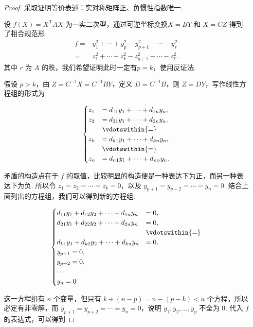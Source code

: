 \begin{proof}
    采取证明等价表述：实对称矩阵正、负惯性指数唯一.

    设 $f(X) = X^\mathrm{T}AX$ 为一实二次型，通过可逆坐标变换$X = BY$ 和 $X = CZ$ 得到了相合规范形
    \begin{align*}
        f ={} & y_1^2 + \cdots + y_p^2 - y_{p+1}^2 - \cdots - y_r^2 \\
          ={} & z_1^2 + \cdots + z_k^2 - z_{q+1}^2 - \cdots - z_r^2.
    \end{align*}
    其中 $r$ 为 $A$ 的秩，我们希望证明此时一定有$p = k$，使用反证法.

    假设 $p > k$，由 $Z = C^{-1}X = C^{-1}BY$，定义 $D = C^{-1}B$，则 $Z = DY$，写作线性方程组的形式为

    \[
        \begin{cases}
            z_1 & = d_{11}y_1 + \cdots + d_{1n}y_n, \\
            z_2 & = d_{21}y_1 + \cdots + d_{2n}y_n, \\
            & \vdotswithin{=} \\
            z_k & = d_{k1}y_1 + \cdots + d_{kn}y_n, \\
            & \vdotswithin{=} \\
            z_{n} & = d_{n1}y_1 + \cdots + d_{nn}y_n.
        \end{cases}
    \]

    矛盾的构造点在于 $f$ 的取值，比较明显的构造便是一种表达下为正，而另一种表达下为负. 所以令 $z_1 = z_2 = \cdots = z_k = 0$，以及 $y_{p + 1} = y_{p + 2} = \cdots = y_n = 0$. 结合上面列出的方程组，我们可以得到新的方程组.

    \[
        \begin{cases}
            d_{11}y_1 + d_{12}y_2 + \cdots + d_{1n}y_n & = 0, \\
            d_{21}y_1 + d_{22}y_2 + \cdots + d_{2n}y_n & = 0, \\
            & \vdotswithin{=} \\
            d_{k1}y_1 + d_{k2}y_2 + \cdots + d_{kn}y_n & = 0. \\
            y_{p + 1} = 0, \\
            y_{p + 2} = 0, \\
            \cdots \\
            y_n = 0.
        \end{cases}
    \]

    这一方程组有 $n$ 个变量，但只有 $k + (n - p) = n - (p - k) < n$ 个方程，所以必定有非零解，而 $y_{p + 1} = y_{p + 2} = \cdots = y_n = 0$，说明 $y_1, y_2, \ldots, y_p$ 不全为 $0$. 代入 $f$ 的表达式，可以得到


\end{proof}
